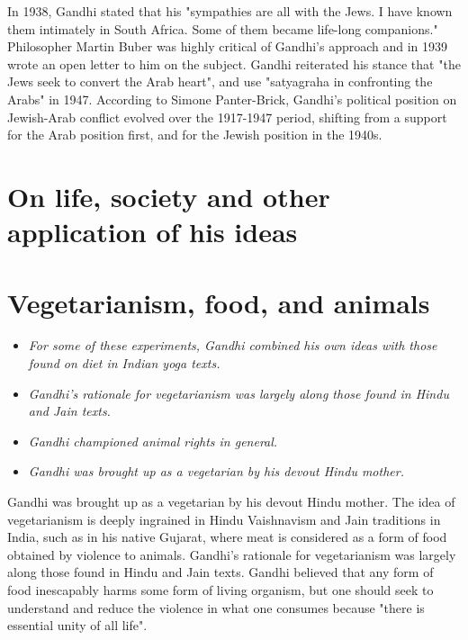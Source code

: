 In 1938, Gandhi stated that his "sympathies are all with the Jews. I
have known them intimately in South Africa. Some of them became
life-long companions." Philosopher Martin Buber was highly critical of
Gandhi's approach and in 1939 wrote an open letter to him on the
subject. Gandhi reiterated his stance that "the Jews seek to convert the
Arab heart", and use "satyagraha in confronting the Arabs" in 1947.
According to Simone Panter-Brick, Gandhi's political position on
Jewish-Arab conflict evolved over the 1917-1947 period, shifting from a
support for the Arab position first, and for the Jewish position in the
1940s.

\section{On life, society and other application of his
ideas}\label{on-life-society-and-other-application-of-his-ideas}

\section{Vegetarianism, food, and
animals}\label{vegetarianism-food-and-animals}

\begin{itemize}
\item
  \emph{For some of these experiments, Gandhi combined his own ideas
  with those found on diet in Indian yoga texts.}
\item
  \emph{Gandhi's rationale for vegetarianism was largely along those
  found in Hindu and Jain texts.}
\item
  \emph{Gandhi championed animal rights in general.}
\item
  \emph{Gandhi was brought up as a vegetarian by his devout Hindu
  mother.}
\end{itemize}

Gandhi was brought up as a vegetarian by his devout Hindu mother. The
idea of vegetarianism is deeply ingrained in Hindu Vaishnavism and Jain
traditions in India, such as in his native Gujarat, where meat is
considered as a form of food obtained by violence to animals. Gandhi's
rationale for vegetarianism was largely along those found in Hindu and
Jain texts. Gandhi believed that any form of food inescapably harms some
form of living organism, but one should seek to understand and reduce
the violence in what one consumes because "there is essential unity of
all life".

